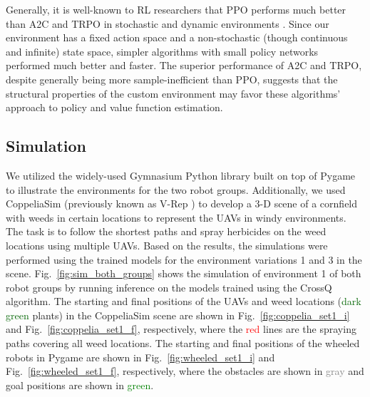 \documentclass{article}
\begin{document}
Generally, it is well-known to RL researchers that PPO performs much better than A2C and TRPO in stochastic and dynamic environments \cite{schulman2017ppo, henderson2018deep}. Since our environment has a fixed action space and a non-stochastic (though continuous and infinite) state space, simpler algorithms with small policy networks performed much better and faster. The superior performance of A2C and TRPO, despite generally being more sample-inefficient than PPO, suggests that the structural properties of the custom environment may favor these algorithms' approach to policy and value function estimation. %


\subsection{Simulation}
We utilized the widely-used Gymnasium \cite{towers2024gymnasium} Python library built on top of Pygame \cite{pygame} to illustrate the environments for the two robot groups. Additionally, we used CoppeliaSim \cite{coppeliaSim2013} (previously known as V-Rep \cite{vrep2013}) to develop a 3-D scene of a cornfield with weeds in certain locations to represent the UAVs in windy environments. The task is to follow the shortest paths and spray herbicides on the weed locations using multiple UAVs. Based on the results, the simulations were performed using the trained models for the environment variations 1 and 3 in the scene. Fig.~\ref{fig:sim_both_groups} shows the simulation of environment 1 of both robot groups by running inference on the models trained using the CrossQ \cite{bhatt2024crossq} algorithm. The starting and final positions of the UAVs and weed locations (\textcolor{darkgreen}{dark green} plants) in the CoppeliaSim scene are shown in Fig.~\ref{fig:coppelia_set1_i} and  Fig.~\ref{fig:coppelia_set1_f}, respectively, where the \textcolor{red}{red} lines are the spraying paths covering all weed locations. The starting and final positions of the wheeled robots in Pygame are shown in Fig.~\ref{fig:wheeled_set1_i} and  Fig.~\ref{fig:wheeled_set1_f}, respectively, where the obstacles are shown in \textcolor{gray}{gray} and goal positions are shown in \textcolor{green}{green}.
\end{document}
